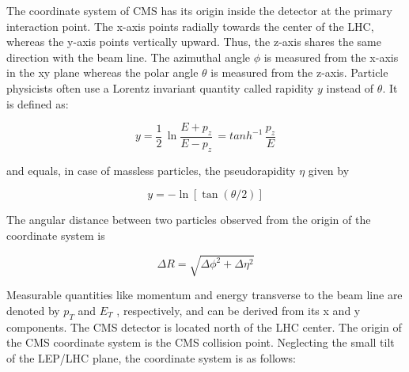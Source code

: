 The coordinate system of CMS has its origin inside the detector at the primary
interaction point. The x-axis points radially towards the center of the
LHC, whereas the y-axis points vertically upward. Thus, the z-axis shares the
same direction with the beam line. The azimuthal angle $\phi$ is measured from
the x-axis in the xy plane whereas the polar angle $\theta$ is measured from the z-axis.
Particle physicists often use a Lorentz invariant quantity called rapidity
$y$ instead of $\theta$. It is defined as:

\begin{equation}
\label{eq:CMSqd1}
 y = \frac{1}{2} \,\ln \frac{E + p_z}{E - p_z} \, = tanh^{-1} \,\frac{p_z}{E}
\end{equation}

and equals, in case of massless particles, the pseudorapidity $\eta $ given by

\begin{equation}
\label{eq:CMSqd2}
 y = -\ln[\tan(\theta/2)]
\end{equation}

The angular distance between two particles observed from the origin of the
coordinate system is

\begin{equation}
\label{eq:CMSqd3}
\Delta R = \sqrt{\Delta \phi^2 + \Delta \eta^2} 
\end{equation}

Measurable quantities like momentum and energy transverse to the beam line
are denoted by $p_T$ and $E_T$ , respectively, and can be derived from its x and
y components. The CMS detector is located north of the LHC center. The
origin of the CMS coordinate system is the CMS collision point. Neglecting
the small tilt of the LEP/LHC plane, the coordinate system is as follows:
